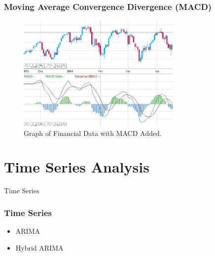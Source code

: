 \documentclass{beamer}
\begin{document}
\begin{frame}
\frametitle{Moving Average Convergence Divergence (MACD)}

\begin{figure}
\centering
\includegraphics[width=8cm]{../Figures/presentation_macd}
\caption{Graph of Financial Data with MACD Added.}
\label{fig:presentation_macd}
\end{figure}


\end{frame}

\section{Time Series Analysis} %

\begin{frame}
\Huge{\centerline{Time Series}}
\end{frame}

\begin{frame}
\frametitle{Time Series}

\begin{itemize}
\item ARIMA
\item Hybrid ARIMA
\end{itemize}

\end{frame}
\end{document}
